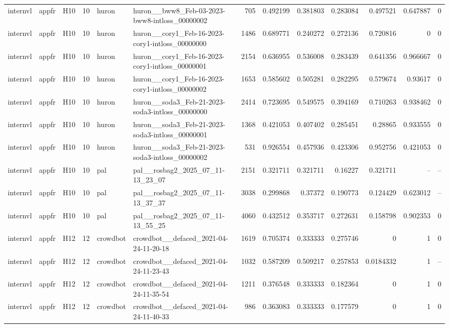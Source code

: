 \begin{longtable}{lllrllrrrrrrr}
internvl & appfr & H10 & 10 & huron & huron\_\_bww8\_Feb-03-2023-bww8-intloss\_00000002 & 705 & 0.492199 & 0.381803 & 0.283084 & 0.497521 & 0.647887 & 0 \\
internvl & appfr & H10 & 10 & huron & huron\_\_cory1\_Feb-16-2023-cory1-intloss\_00000000 & 1486 & 0.689771 & 0.240272 & 0.272136 & 0.720816 & 0 & 0 \\
internvl & appfr & H10 & 10 & huron & huron\_\_cory1\_Feb-16-2023-cory1-intloss\_00000001 & 2154 & 0.636955 & 0.536008 & 0.283439 & 0.641356 & 0.966667 & 0 \\
internvl & appfr & H10 & 10 & huron & huron\_\_cory1\_Feb-16-2023-cory1-intloss\_00000002 & 1653 & 0.585602 & 0.505281 & 0.282295 & 0.579674 & 0.93617 & 0 \\
internvl & appfr & H10 & 10 & huron & huron\_\_soda3\_Feb-21-2023-soda3-intloss\_00000000 & 2414 & 0.723695 & 0.549575 & 0.394169 & 0.710263 & 0.938462 & 0 \\
internvl & appfr & H10 & 10 & huron & huron\_\_soda3\_Feb-21-2023-soda3-intloss\_00000001 & 1368 & 0.421053 & 0.407402 & 0.285451 & 0.28865 & 0.933555 & 0 \\
internvl & appfr & H10 & 10 & huron & huron\_\_soda3\_Feb-21-2023-soda3-intloss\_00000002 & 531 & 0.926554 & 0.457936 & 0.423306 & 0.952756 & 0.421053 & 0 \\
internvl & appfr & H10 & 10 & pal & pal\_\_rosbag2\_2025\_07\_11-13\_23\_07 & 2151 & 0.321711 & 0.321711 & 0.16227 & 0.321711 & -- & -- \\
internvl & appfr & H10 & 10 & pal & pal\_\_rosbag2\_2025\_07\_11-13\_37\_37 & 3038 & 0.299868 & 0.37372 & 0.190773 & 0.124429 & 0.623012 & -- \\
internvl & appfr & H10 & 10 & pal & pal\_\_rosbag2\_2025\_07\_11-13\_55\_25 & 4060 & 0.432512 & 0.353717 & 0.272631 & 0.158798 & 0.902353 & 0 \\
internvl & appfr & H12 & 12 & crowdbot & crowdbot\_\_defaced\_2021-04-24-11-20-18 & 1619 & 0.705374 & 0.333333 & 0.275746 & 0 & 1 & 0 \\
internvl & appfr & H12 & 12 & crowdbot & crowdbot\_\_defaced\_2021-04-24-11-23-43 & 1032 & 0.587209 & 0.509217 & 0.257853 & 0.0184332 & 1 & -- \\
internvl & appfr & H12 & 12 & crowdbot & crowdbot\_\_defaced\_2021-04-24-11-35-54 & 1211 & 0.376548 & 0.333333 & 0.182364 & 0 & 1 & 0 \\
internvl & appfr & H12 & 12 & crowdbot & crowdbot\_\_defaced\_2021-04-24-11-40-33 & 986 & 0.363083 & 0.333333 & 0.177579 & 0 & 1 & 0 \\

\end{longtable}
